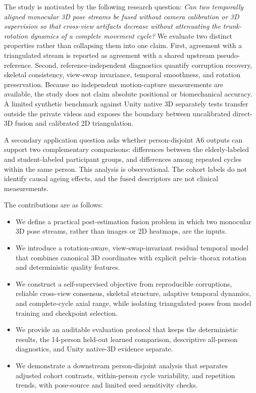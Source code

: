 The study is motivated by the following research question: \emph{Can two
temporally aligned monocular 3D pose streams be fused without camera calibration
or 3D supervision so that cross-view artifacts decrease without attenuating the
trunk-rotation dynamics of a complete movement cycle?} We evaluate two distinct
properties rather than collapsing them into one claim. First, agreement with a
triangulated stream is reported as agreement with a shared upstream
pseudo-reference. Second, reference-independent diagnostics quantify corruption
recovery, skeletal consistency, view-swap invariance, temporal smoothness, and
rotation preservation. Because no independent motion-capture measurements are
available, the study does not claim absolute positional or biomechanical
accuracy. A limited synthetic benchmark against Unity native 3D separately
tests transfer outside the private videos and exposes the boundary between
uncalibrated direct-3D fusion and calibrated 2D triangulation.

A secondary application question asks whether person-disjoint A6 outputs can
support two complementary comparisons: differences between the
elderly-labeled and student-labeled participant groups, and differences among
repeated cycles within the same person. This analysis is observational. The
cohort labels do not identify causal ageing effects, and the fused descriptors
are not clinical measurements.

The contributions are as follows:
\begin{itemize}
  \item We define a practical post-estimation fusion problem in which two
  monocular 3D pose streams, rather than images or 2D heatmaps, are the inputs.
  \item We introduce a rotation-aware, view-swap-invariant residual temporal
  model that combines canonical 3D coordinates with explicit pelvis--thorax
  rotation and deterministic quality features.
  \item We construct a self-supervised objective from reproducible corruptions,
  reliable cross-view consensus, skeletal structure, adaptive temporal dynamics,
  and complete-cycle axial range, while isolating triangulated poses from model
  training and checkpoint selection.
  \item We provide an auditable evaluation protocol that keeps the deterministic
  results, the 14-person held-out learned comparison, descriptive all-person
  diagnostics, and Unity native-3D evidence separate.
  \item We demonstrate a downstream person-disjoint analysis that separates
  adjusted cohort contrasts, within-person cycle variability, and repetition
  trends, with pose-source and limited seed sensitivity checks.
\end{itemize}

